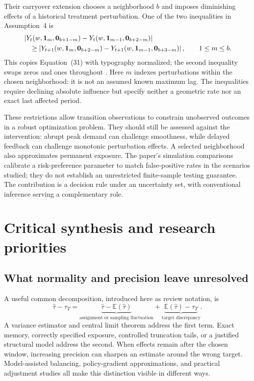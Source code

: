\documentclass[12pt]{article}
\begin{document}
Their carryover extension chooses a neighborhood $b$ and imposes diminishing effects of a historical treatment perturbation. One of the two inequalities in Assumption~4 is
\begin{align}\label{eq:decision-monotonicity}
 &\left|Y_t(w,\mathbf{1}_{m},\mathbf{0}_{b+1-m})
       -Y_t(w,\mathbf{1}_{m-1},\mathbf{0}_{b+2-m})\right|\notag\\
 &\quad\geq
 \left|Y_{t+1}(w,\mathbf{1}_{m},\mathbf{0}_{b+2-m})
       -Y_{t+1}(w,\mathbf{1}_{m-1},\mathbf{0}_{b+3-m})\right|,
 \qquad 1\leq m\leq b.
\end{align}
This copies Equation~(31) with typography normalized; the second inequality swaps zeros and ones throughout \citep[p.~21]{ni2025decision}. Here $m$ indexes perturbations within the chosen neighborhood: it is not an assumed known maximum lag. The inequalities require declining absolute influence but specify neither a geometric rate nor an exact last affected period.

These restrictions allow transition observations to constrain unobserved outcomes in a robust optimization problem. They should still be assessed against the intervention: abrupt peak demand can challenge smoothness, while delayed feedback can challenge monotonic perturbation effects. A selected neighborhood also approximates permanent exposure. The paper's simulation comparisons calibrate a risk-preference parameter to match false-positive rates in the scenarios studied; they do not establish an unrestricted finite-sample testing guarantee. The contribution is a decision rule under an uncertainty set, with conventional inference serving a complementary role.

\section{Critical synthesis and research priorities}\label{sec:synthesis}

\subsection{What normality and precision leave unresolved}

A useful common decomposition, introduced here as review notation, is
\begin{equation}\label{eq:error-decomposition}
 \widehat\tau-\tau_T
 =\underbrace{\widehat\tau-\mathbb{E}(\widehat\tau)}_{\text{assignment or sampling fluctuation}}
 +\underbrace{\mathbb{E}(\widehat\tau)-\tau_T}_{\text{target discrepancy}}.
\end{equation}
A variance estimator and central limit theorem address the first term. Exact memory, correctly specified exposure, controlled truncation tails, or a justified structural model address the second. When effects remain after the chosen window, increasing precision can sharpen an estimate around the wrong target. Model-assisted balancing, policy-gradient approximations, and practical adjustment studies all make this distinction visible in different ways.
\end{document}
